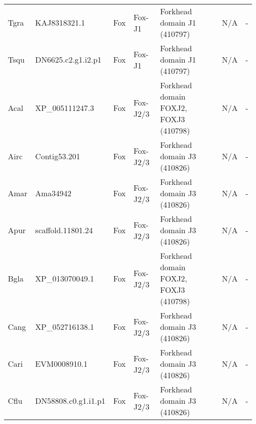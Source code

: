 \documentclass[../main.tex]{subfiles}
\begin{document}
\begin{landscape}
\begin{longtable}{lllllll}
		Tgra           & KAJ8318321.1          & Fox            & Fox-J1              & Forkhead domain J1 (410797)                 & N/A                                                                    & -                    \\
		Tsqu           & DN6625.c2.g1.i2.p1    & Fox            & Fox-J1              & Forkhead domain J1 (410797)                 & N/A                                                                    & -                    \\
		Acal           & XP\_005111247.3       & Fox            & Fox-J2/3            & Forkhead domain FOXJ2, FOXJ3 (410798)       & N/A                                                                    & -                    \\
		Airc           & Contig53.201          & Fox            & Fox-J2/3            & Forkhead domain J3 (410826)                 & N/A                                                                    & -                    \\
		Amar           & Ama34942              & Fox            & Fox-J2/3            & Forkhead domain J3 (410826)                 & N/A                                                                    & -                    \\
		Apur           & scaffold.11801.24     & Fox            & Fox-J2/3            & Forkhead domain J3 (410826)                 & N/A                                                                    & -                    \\
		Bgla           & XP\_013070049.1       & Fox            & Fox-J2/3            & Forkhead domain FOXJ2, FOXJ3 (410798)       & N/A                                                                    & -                    \\
		Cang           & XP\_052716138.1       & Fox            & Fox-J2/3            & Forkhead domain J3 (410826)                 & N/A                                                                    & -                    \\
		Cari           & EVM0008910.1          & Fox            & Fox-J2/3            & Forkhead domain J3 (410826)                 & N/A                                                                    & -                    \\
		Cflu           & DN58808.c0.g1.i1.p1   & Fox            & Fox-J2/3            & Forkhead domain J3 (410826)                 & N/A                                                                    & -                    \\

\end{longtable}
\end{landscape}
\end{document}
